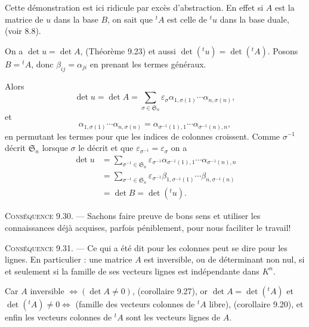 Cette démonstration est ici ridicule par excès d'abstraction. En effet si $A$ est la matrice de $u$ dans la base $B$, on sait que ${}^tA$ est celle de ${}^tu$ dans la base duale, (voir 8.8).

On a $\det u=\det A$, (Théorème 9.23) et aussi $\det({}^tu)=\det({}^tA)$. Posons $B={}^tA$, donc $\beta_{ij}=\alpha_{ji}$ en prenant les termes généraux.

Alors
\[
\det u=\det A=\sum_{\sigma\in\mathfrak S_n}\varepsilon_\sigma
\alpha_{1,\sigma(1)}\cdots\alpha_{n,\sigma(n)},
\]
et
\[
\alpha_{1,\sigma(1)}\cdots\alpha_{n,\sigma(n)}=
\alpha_{\sigma^{-1}(1),1}\cdots\alpha_{\sigma^{-1}(n),n},
\]
en permutant les termes pour que les indices de colonnes croissent. Comme $\sigma^{-1}$ décrit $\mathfrak S_n$ lorsque $\sigma$ le décrit et que $\varepsilon_{\sigma^{-1}}=\varepsilon_\sigma$ on a
\begin{align*}
\det u&=\sum_{\sigma^{-1}\in\mathfrak S_n}\varepsilon_{\sigma^{-1}}
\alpha_{\sigma^{-1}(1),1}\cdots\alpha_{\sigma^{-1}(n),n}\\
&=\sum_{\sigma^{-1}\in\mathfrak S_n}\varepsilon_{\sigma^{-1}}
\beta_{1,\sigma^{-1}(1)}\cdots\beta_{n,\sigma^{-1}(n)}\\
&=\det B=\det({}^tu).
\end{align*}
\bookend

\medskip\noindent\textsc{Conséquence 9.30.} --- Sachons faire preuve de bons sens et utiliser les connaissances déjà acquises, parfois péniblement, pour nous faciliter le travail!

\medskip\noindent\textsc{Conséquence 9.31.} --- Ce qui a été dit pour les colonnes peut se dire pour les lignes. En particulier : une matrice $A$ est inversible, ou de déterminant non nul, si et seulement si la famille de ses vecteurs lignes est indépendante dans $K^n$.

Car $A$ inversible $\Longleftrightarrow (\det A\ne0)$, (corollaire 9.27), or $\det A=\det({}^tA)$ et $\det({}^tA)\ne0\Longleftrightarrow$ (famille des vecteurs colonnes de ${}^tA$ libre), (corollaire 9.20), et enfin les vecteurs colonnes de ${}^tA$ sont les vecteurs lignes de $A$. \bookend
